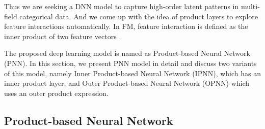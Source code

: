 \documentclass[conference]{IEEEtran}
\newcommand{\rocky}[1]{{\bf \color{pink} [[Rocky says ``#1'']]}}
\begin{document}
Thus we are seeking a DNN model to capture high-order latent patterns in multi-field categorical data. And we come up with the idea of product layers to explore feature interactions automatically. In FM, feature interaction is defined as the inner product of two feature vectors \cite{rendle2010factorization}.

The proposed deep learning model is named as Product-based Neural Network (PNN). In this section, we present PNN model in detail and discuss two variants of this model, namely Inner Product-based Neural Network (IPNN), which has an inner product layer, and Outer Product-based Neural Network (OPNN) which uses an outer product expression.



\subsection{Product-based Neural Network}

\end{document}
